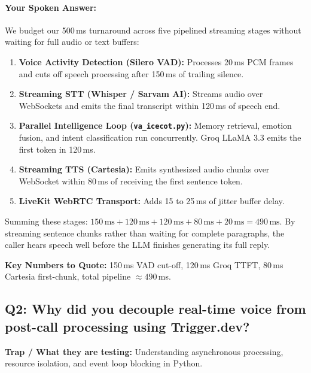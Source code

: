 \documentclass[11pt,a4paper]{article}
\begin{document}
\paragraph{Your Spoken Answer:}
We budget our 500\,ms turnaround across five pipelined streaming stages without waiting for full audio or text buffers:
\begin{enumerate}
    \item \textbf{Voice Activity Detection (Silero VAD):} Processes 20\,ms PCM frames and cuts off speech processing after 150\,ms of trailing silence.
    \item \textbf{Streaming STT (Whisper / Sarvam AI):} Streams audio over WebSockets and emits the final transcript within 120\,ms of speech end.
    \item \textbf{Parallel Intelligence Loop (\texttt{va\_icecot.py}):} Memory retrieval, emotion fusion, and intent classification run concurrently. Groq LLaMA 3.3 emits the first token in 120\,ms.
    \item \textbf{Streaming TTS (Cartesia):} Emits synthesized audio chunks over WebSocket within 80\,ms of receiving the first sentence token.
    \item \textbf{LiveKit WebRTC Transport:} Adds 15 to 25\,ms of jitter buffer delay.
\end{enumerate}
Summing these stages: $150\,\text{ms} + 120\,\text{ms} + 120\,\text{ms} + 80\,\text{ms} + 20\,\text{ms} = 490\,\text{ms}$. By streaming sentence chunks rather than waiting for complete paragraphs, the caller hears speech well before the LLM finishes generating its full reply.

\noindent\textbf{Key Numbers to Quote:} 150\,ms VAD cut-off, 120\,ms Groq TTFT, 80\,ms Cartesia first-chunk, total pipeline $\approx 490$\,ms.

\vspace{1em}

\subsection*{Q2: Why did you decouple real-time voice from post-call processing using Trigger.dev?}
\textbf{Trap / What they are testing:} Understanding asynchronous processing, resource isolation, and event loop blocking in Python.
\end{document}
